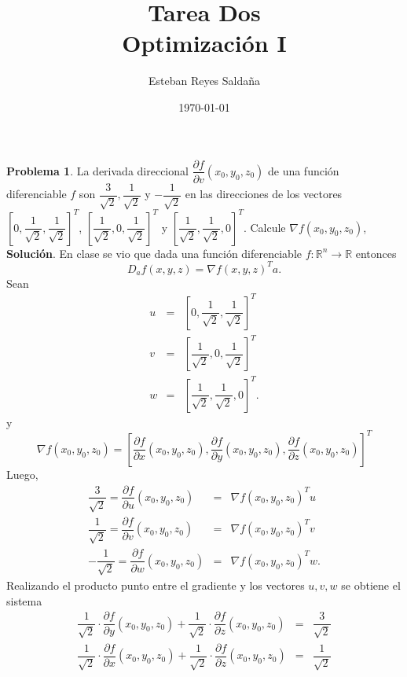 \documentclass[12pt,letterpaper]{article}
\title{ \textbf{Tarea Dos} \\ Optimización I}
\author{Esteban Reyes Saldaña}
\date{\today}
\theoremstyle{definition}
\newtheorem{problm}{Problema}
\begin{document}
	
\maketitle 
\begin{problm}
	La derivada direccional $ \dfrac{\partial f}{\partial v} (x_0, y_0, z_0) $ de una función diferenciable $ f $ son $ \dfrac{3}{\sqrt{2}}, \dfrac{1}{\sqrt{2}} $ y $ -\dfrac{1}{\sqrt{2}} $ en las direcciones de los vectores $ \left[ 0, \dfrac{1}{\sqrt{2}}, \dfrac{1}{\sqrt{2}} \right]^T $, $ \left[ \dfrac{1}{\sqrt{2}}, 0, \dfrac{1}{\sqrt{2}} \right]^T $ y $ \left[ \dfrac{1}{\sqrt{2}}, \dfrac{1}{\sqrt{2}}, 0 \right]^T $. Calcule $ \nabla f(x_0, y_0, z_0) $,
	\\
	\textbf{Solución}. En clase se vio que dada  una función diferenciable $ f: \mathbb{R}^n \to \mathbb{R} $ entonces
	\[ D_a f(x, y, z) = \nabla f(x,y,z)^T a. \]
	Sean 
	\begin{eqnarray*}
		u & = & \left[ 0, \dfrac{1}{\sqrt{2}}, \dfrac{1}{\sqrt{2}} \right]^T  \\
		v & = & \left[ \dfrac{1}{\sqrt{2}}, 0, \dfrac{1}{\sqrt{2}} \right]^T \\
		w & = & \left[ \dfrac{1}{\sqrt{2}}, \dfrac{1}{\sqrt{2}}, 0 \right]^T.
	\end{eqnarray*}
	y 
	\[ \nabla f(x_0,y_0,z_0) = \left[ \dfrac{\partial f}{\partial x}(x_0,y_0, z_0), \dfrac{\partial f}{\partial y}(x_0,y_0, z_0), \dfrac{\partial f}{\partial z}(x_0,y_0, z_0) \right]^T \]
	Luego,
	\begin{eqnarray*}
		\dfrac{3}{\sqrt{2}} = \dfrac{\partial f}{\partial u} (x_0, y_0, z_0) & = & \nabla f(x_0, y_0, z_0)^T u \\
		\dfrac{1}{\sqrt{2}} = \dfrac{\partial f}{\partial v} (x_0, y_0, z_0) & = & \nabla f(x_0, y_0, z_0)^T v \\
		-\dfrac{1}{\sqrt{2}} = \dfrac{\partial f}{\partial w} (x_0, y_0, z_0) & = & \nabla f(x_0, y_0, z_0)^T w.
	\end{eqnarray*}
	Realizando el producto punto entre el gradiente y los vectores $ u,v,w $ se obtiene el sistema
	\begin{eqnarray*}
		\dfrac{1}{\sqrt{2}} \cdot \dfrac{\partial f}{\partial y}(x_0,y_0, z_0) + \dfrac{1}{\sqrt{2}} \cdot \dfrac{\partial f}{\partial z}(x_0,y_0, z_0) & = & \dfrac{3}{\sqrt{2}} \\
		\dfrac{1}{\sqrt{2}} \cdot \dfrac{\partial f}{\partial x}(x_0,y_0, z_0) + \dfrac{1}{\sqrt{2}} \cdot \dfrac{\partial f}{\partial z}(x_0,y_0, z_0) & = & \dfrac{1}{\sqrt{2}} \\

\end{eqnarray*}
\end{problm}
\end{document}
